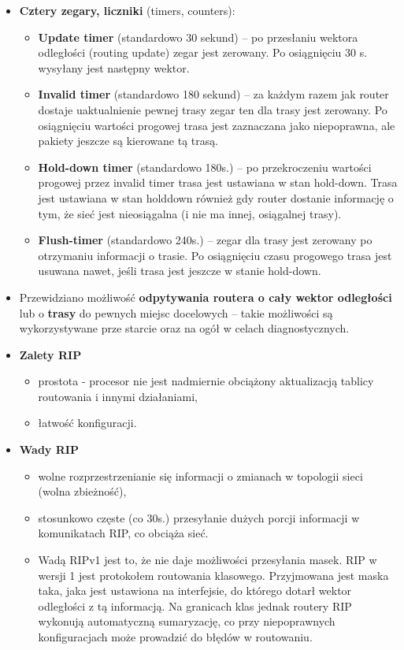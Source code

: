 \documentclass[a4paper]{article}
\begin{document}
\begin{itemize}
    \item \textbf{Cztery zegary, liczniki} (timers, counters):
    \begin{itemize}
        \item \textbf{Update timer} (standardowo 30 sekund) – po przesłaniu wektora odległości
        (routing update) zegar jest zerowany. Po osiągnięciu 30 s. wysyłany jest następny wektor.
        \item \textbf{Invalid timer} (standardowo 180 sekund) – za każdym razem jak router dostaje uaktualnienie pewnej trasy zegar ten dla trasy jest zerowany. Po osiągnięciu wartości progowej trasa jest zaznaczana jako niepoprawna, ale pakiety jeszcze są kierowane tą trasą.
        \item \textbf{Hold-down timer} (standardowo 180s.) – po przekroczeniu wartości progowej
        przez invalid timer trasa jest ustawiana w stan hold-down. Trasa jest ustawiana w stan holddown również gdy router dostanie informację o tym, że sieć jest nieosiągalna (i nie ma innej, osiągalnej trasy).
        \item \textbf{Flush-timer} (standardowo 240s.) – zegar dla trasy jest zerowany po otrzymaniu informacji o trasie. Po osiągnięciu czasu progowego trasa jest usuwana nawet, jeśli trasa jest jeszcze w stanie hold-down.
    \end{itemize}

    \item Przewidziano możliwość \textbf{odpytywania routera o cały wektor odległości} lub o \textbf{trasy} do pewnych miejsc docelowych – takie możliwości są wykorzystywane prze starcie oraz na ogół w celach diagnostycznych.\\

    \item \textbf{Zalety RIP}
    \begin{itemize}
        \item prostota - procesor nie jest nadmiernie obciążony aktualizacją tablicy routowania i innymi działaniami,
        \item łatwość konfiguracji.
    \end{itemize}

    \item \textbf{Wady RIP}
    \begin{itemize}
        \item wolne rozprzestrzenianie się informacji o zmianach w topologii sieci (wolna zbieżność),
        \item stosunkowo częste (co 30s.) przesyłanie dużych porcji informacji w komunikatach RIP, co obciąża sieć.
        \item Wadą RIPv1 jest to, że nie daje możliwości przesyłania masek. RIP w wersji 1 jest protokołem routowania klasowego. Przyjmowana jest maska taka, jaka jest ustawiona na interfejsie, do którego dotarł wektor odległości z tą informacją. Na granicach klas jednak routery RIP wykonują automatyczną sumaryzację, co przy niepoprawnych konfiguracjach może prowadzić do błędów w routowaniu.
    \end{itemize}


\end{itemize}
\end{document}
